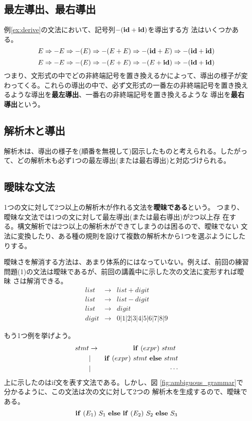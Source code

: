 \documentclass[a4j,11pt]{jsarticle}
\begin{document}
\subsection{最左導出、最右導出}

例\ref{ex:derive}の文法において、記号列$-({\bf id}+{\bf id})$を導出する方
法はいくつかある。
\[
 E \Rightarrow -E \Rightarrow -(E) \Rightarrow -(E+E) \Rightarrow
  -({\bf id}+E) \Rightarrow -({\bf id}+{\bf id})
\]
\[
 E \Rightarrow -E \Rightarrow -(E) \Rightarrow -(E+E) \Rightarrow
  -(E+{\bf id}) \Rightarrow -({\bf id}+{\bf id})
\]
つまり、文形式の中でどの非終端記号を置き換えるかによって、導出の様子が変
わってくる。これらの導出の中で、必ず文形式の一番左の非終端記号を置き換え
るような導出を{\bfseries 最左導出}、一番右の非終端記号を置き換えるような
導出を{\bfseries 最右導出}という。

\subsection{解析木と導出}

解析木は、導出の様子を(順番を無視して)図示したものと考えられる。したがっ
て、どの解析木も必ず1つの最左導出(または最右導出)と対応づけられる。

\subsection{曖昧な文法}

1つの文に対して2つ以上の解析木が作れる文法を{\bfseries 曖昧である}という。
つまり、曖昧な文法では1つの文に対して最左導出(または最右導出)が2つ以上存
在する。構文解析では2つ以上の解析木ができてしまうのは困るので、曖昧でない
文法に変換したり、ある種の規則を設けて複数の解析木から1つを選ぶようにした
りする。

曖昧さを解消する方法は、あまり体系的にはなっていない。例えば、前回の練習
問題(1)の文法は曖昧であるが、前回の講義中に示した次の文法に変形すれば曖昧
さは解消できる。
\begin{eqnarray*}
 list & \rightarrow & list + digit \\
 list & \rightarrow & list - digit \\
 list & \rightarrow & digit \\
 digit & \rightarrow & 0 | 1 | 2 | 3 | 4 | 5 | 6 | 7 | 8 | 9
\end{eqnarray*}

もう1つ例を挙げよう。
\begin{eqnarray*}
 stmt & \rightarrow & {\bf if}\ (expr)\ stmt\  \\
      & | & {\bf if}\ (expr)\ stmt\ {\bf else}\ stmt \\
      & | & \cdots
\end{eqnarray*}
上に示したのはif文を表す文法である。しかし、図
\ref{fig:ambiguous_grammar}で分かるように、この文法は次の文に対して2つの
解析木を生成するので、曖昧である。
\[
 {\bf if}\ (E_1)\ S_1\ {\bf else}\ {\bf if}\ (E_2)\ S_2\ {\bf else}\ S_3
\]
\end{document}
